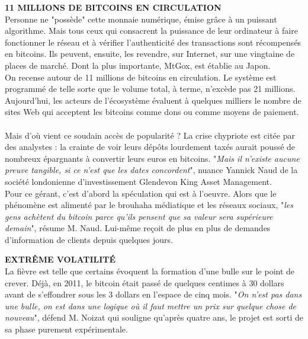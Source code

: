 \documentclass[11pt,twoside,a4paper]{article}
\begin{document}
\textbf{11 MILLIONS DE BITCOINS EN CIRCULATION}~\\

Personne ne "poss{\`e}de" cette monnaie num{\'e}rique, {\'e}mise gr{\^a}ce {\`a} un puissant algorithme. Mais tous ceux qui consacrent la puissance de leur ordinateur {\`a} faire fonctionner le r{\'e}seau et {\`a} v{\'e}rifier l'authenticit{\'e} des transactions sont r{\'e}compens{\'e}s en bitcoins. Ils peuvent, ensuite, les revendre, sur Internet, sur une vingtaine de places de march{\'e}. Dont la plus importante, MtGox, est {\'e}tablie au Japon. ~\\

On recense autour de 11 millions de bitcoins en circulation. Le syst{\`e}me est programm{\'e} de telle sorte que le volume total, {\`a} terme, n'exc{\`e}de pas 21 millions. Aujourd'hui, les acteurs de l'{\'e}cosyst{\`e}me {\'e}valuent {\`a} quelques milliers le nombre de sites Web qui acceptent les bitcoins comme dons ou comme moyens de paiement. ~\\

Mais d'o{\`u} vient ce soudain acc{\`e}s de popularit{\'e} ? La crise chypriote est cit{\'e}e par des analystes : la crainte de voir leurs d{\'e}p{\^o}ts lourdement tax{\'e}s aurait pouss{\'e} de nombreux {\'e}pargnants {\`a} convertir leurs euros en bitcoins. "\emph{Mais il n'existe aucune preuve tangible, si ce n'est que les dates concordent}", nuance Yannick Naud de la soci{\'e}t{\'e} londonienne d'investissement Glendevon King Asset Management. ~\\

Pour ce g{\'e}rant, c'est d'abord la sp{\'e}culation qui est {\`a} l'oeuvre. Alors que le ph{\'e}nom{\`e}ne est aliment{\'e} par le brouhaha m{\'e}diatique et les r{\'e}seaux sociaux, "\emph{les gens ach{\`e}tent du bitcoin parce qu'ils pensent que sa valeur sera sup{\'e}rieure demain}", r{\'e}sume M. Naud. Lui-m{\^e}me re\c{c}oit de plus en plus de demandes d'information de clients depuis quelques jours. ~\\

\clearpage

\textbf{EXTR{\^E}ME VOLATILIT{\'E}}~\\

La fi{\`e}vre est telle que certains {\'e}voquent la formation d'une bulle sur le point de crever. D{\'e}j{\`a}, en 2011, le bitcoin {\'e}tait pass{\'e} de quelques centimes {\`a} 30 dollars avant de s'effondrer sous les 3 dollars en l'espace de cinq mois. "\emph{On n'est pas dans une bulle, on est dans une logique o{\`u} il faut mettre un prix sur quelque chose de nouveau}", d{\'e}fend M. Noizat qui souligne qu'apr{\`e}s quatre ans, le projet est sorti de sa phase purement exp{\'e}rimentale. ~\\
\end{document}
